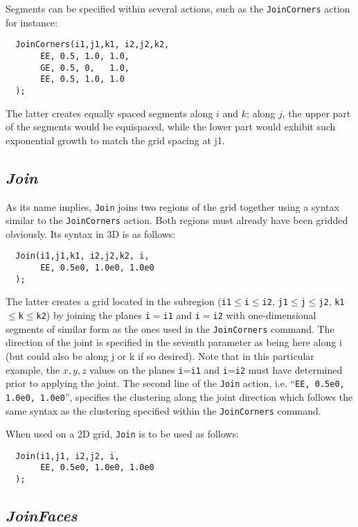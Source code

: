 \documentclass{warpdoc}
\begin{document}
Segments can be specified within several actions, such as the  \verb|JoinCorners| action for instance:
%
\begin{verbatim}
  JoinCorners(i1,j1,k1, i2,j2,k2,
       EE, 0.5, 1.0, 1.0,
       GE, 0.5, 0,   1.0,
       EE, 0.5, 1.0, 1.0
  );
\end{verbatim}
%
The latter creates equally spaced segments along $i$ and $k$;
along $j$, the upper part of the segments would be equispaced,
while the lower part would exhibit such exponential growth to
match the grid spacing at j1.


\subsection{\emph{Join}}

As its name implies, \verb|Join| joins two regions
of the grid together using a syntax similar to the
\verb|JoinCorners| action. Both regions must already
have been gridded obviously. Its syntax in 3D is as follows:
%
\begin{verbatim}
  Join(i1,j1,k1, i2,j2,k2, i,
       EE, 0.5e0, 1.0e0, 1.0e0
  );
\end{verbatim}
%
The latter creates a grid located in the subregion
(\verb|i1|$\leq$\verb|i|$\leq$\verb|i2|,
  \verb|j1|$\leq$\verb|j|$\leq$\verb|j2|,
  \verb|k1|$\leq$\verb|k|$\leq$\verb|k2|)
by joining the planes \verb|i|$=$\verb|i1| and \verb|i|$=$\verb|i2| with
one-dimensional segments of similar form as the ones used in the
\verb|JoinCorners| command. The direction of the joint is
specified in the seventh parameter as being here along i
(but could also be along j or k if so desired). Note that
in this particular example, the $x,y,z$ values on the planes
\verb|i|=\verb|i1| and \verb|i|=\verb|i2| must have determined prior
to applying the joint.  The second line of the \verb|Join|
action, i.e. ``\verb|EE, 0.5e0, 1.0e0, 1.0e0|'', specifies the clustering
along the joint direction which follows the same syntax as
the clustering specified within the \verb|JoinCorners| command.

When used on a 2D grid, \verb|Join| is to be used as follows:
%
\begin{verbatim}
  Join(i1,j1, i2,j2, i,
       EE, 0.5e0, 1.0e0, 1.0e0
  );
\end{verbatim}



\subsection{\emph{JoinFaces}}
\end{document}
